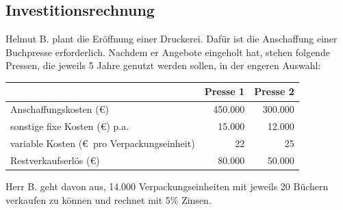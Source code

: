 \documentclass[11pt, a4paper]{article}
\begin{document}
\subsection{Investitionsrechnung}
Helmut B. plant die Eröffnung einer Druckerei. Dafür ist die Anschaffung einer Buchpresse erforderlich. Nachdem er Angebote eingeholt hat, stehen folgende Pressen, die jeweils 5 Jahre genutzt werden sollen, in der engeren Auswahl:

\begin{tabular}{lrr}
	& Presse 1 & Presse 2 \\ \hline
	Anschaffungskosten (\euro) & 450.000 & 300.000 \\
	sonstige fixe Kosten (\euro) p.a. & 15.000 & 12.000 \\
	variable Kosten (\euro \ pro Verpackungseinheit) & 22 & 25 \\
	Restverkaufserlös (\euro) & 80.000 & 50.000
\end{tabular}

Herr B. geht davon aus, 14.000 Verpackungseinheiten mit jeweils 20 Büchern verkaufen zu können und rechnet mit 5\% Zinsen.
\end{document}
